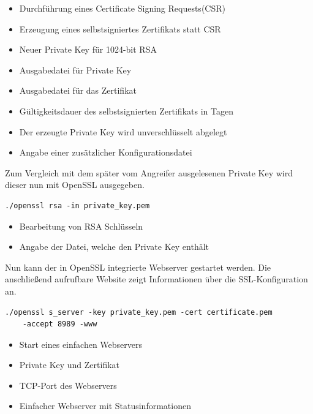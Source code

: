 \begin{itemize}
	\item {} Durchführung eines Certificate Signing Requests(CSR)
	\item {} Erzeugung eines selbstsigniertes Zertifikats statt CSR
	\item {} Neuer Private Key für 1024-bit RSA
	\item {} Ausgabedatei für Private Key
	\item {} Ausgabedatei für das Zertifikat
	\item {} Gültigkeitsdauer des selbstsignierten Zertifikats in Tagen
	\item {} Der erzeugte Private Key wird unverschlüsselt abgelegt
	\item {} Angabe einer zusätzlicher Konfigurationsdatei
\end{itemize}

Zum Vergleich mit dem später vom Angreifer ausgelesenen Private Key wird dieser nun mit OpenSSL ausgegeben.

\begin{lstlisting}
./openssl rsa -in private_key.pem
\end{lstlisting}

\begin{itemize}
	\item {} Bearbeitung von RSA Schlüsseln
	\item {} Angabe der Datei, welche den Private Key enthält
\end{itemize}

Nun kann der in OpenSSL integrierte Webserver gestartet werden. Die anschließend aufrufbare Website zeigt Informationen über die SSL-Konfiguration an.

\begin{lstlisting}
./openssl s_server -key private_key.pem -cert certificate.pem
	-accept 8989 -www
\end{lstlisting}

\begin{itemize}
	\item {} Start eines einfachen Webservers
	\item {} Private Key und Zertifikat
	\item {} TCP-Port des Webservers
	\item {} Einfacher Webserver mit Statusinformationen
\end{itemize}


